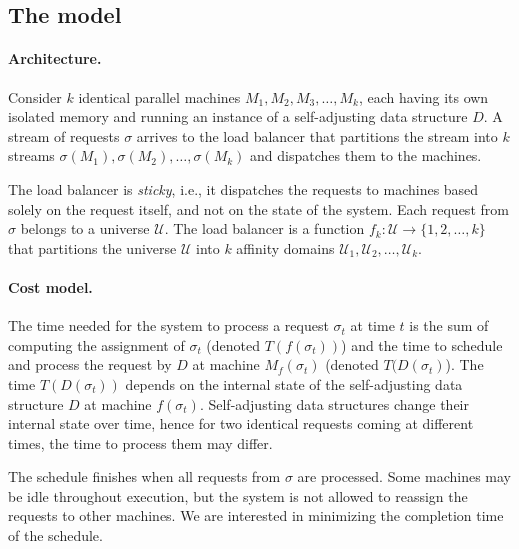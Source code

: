\subsection{The model}
\label{sec:model}

\paragraph{Architecture.}

Consider $k$ identical parallel machines $M_1, M_2, M_3, \ldots, M_k$, each having its own isolated memory and running an instance of a self-adjusting data structure $D$. A stream of requests $\sigma$ arrives to the load balancer that partitions the stream into $k$ streams $\sigma(M_1), \sigma(M_2), \ldots, \sigma(M_k)$ and dispatches them to the machines.

The load balancer is \emph{sticky}, i.e., it dispatches the requests to machines based solely on the request itself, and not on the state of the system.
Each request from $\sigma$ belongs to a universe $\mathcal{U}$. 
The load balancer is a function $f_k : \mathcal{U} \to \{1, 2, \ldots, k\}$ that partitions the universe $\mathcal{U}$ into $k$ affinity domains $\mathcal{U}_1, \mathcal{U}_2, \ldots, \mathcal{U}_k$.

\paragraph{Cost model.}

The time needed for the system to process a request $\sigma_t$ at time $t$ is the sum of computing the assignment of $\sigma_t$ (denoted $T(f(\sigma_t))$) and the time to schedule and process the request by $D$ at machine $M_f(\sigma_t)$ (denoted $T(D(\sigma_t)$).
The time $T(D(\sigma_t))$ depends on the internal state of the self-adjusting data structure $D$ at machine $f(\sigma_t)$.
Self-adjusting data structures change their internal state over time, hence for two identical requests coming at different times, the time to process them may differ.

The schedule finishes when all requests from $\sigma$ are processed. Some machines may be idle throughout execution, but the system is not allowed to reassign the requests to other machines.
We are interested in minimizing the completion time of the schedule.



